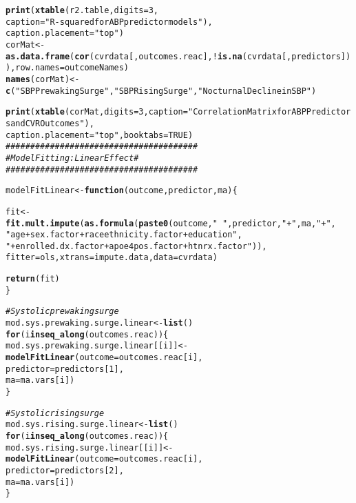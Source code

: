 \documentclass[10pt]{article}\usepackage[]{graphicx}\usepackage[]{color}
\makeatletter
\newcommand{\hlnum}[1]{\textcolor[rgb]{0.686,0.059,0.569}{#1}}%
\newcommand{\hlstr}[1]{\textcolor[rgb]{0.192,0.494,0.8}{#1}}%
\newcommand{\hlcom}[1]{\textcolor[rgb]{0.678,0.584,0.686}{\textit{#1}}}%
\newcommand{\hlopt}[1]{\textcolor[rgb]{0,0,0}{#1}}%
\newcommand{\hlstd}[1]{\textcolor[rgb]{0.345,0.345,0.345}{#1}}%
\newcommand{\hlkwa}[1]{\textcolor[rgb]{0.161,0.373,0.58}{\textbf{#1}}}%
\newcommand{\hlkwb}[1]{\textcolor[rgb]{0.69,0.353,0.396}{#1}}%
\newcommand{\hlkwc}[1]{\textcolor[rgb]{0.333,0.667,0.333}{#1}}%
\newcommand{\hlkwd}[1]{\textcolor[rgb]{0.737,0.353,0.396}{\textbf{#1}}}%
\newenvironment{kframe}{%
 \def\at@end@of@kframe{}%
 \ifinner\ifhmode%
  \def\at@end@of@kframe{\end{minipage}}%
  \begin{minipage}{\columnwidth}%
 \fi\fi%
 \def\FrameCommand##1{\hskip\@totalleftmargin \hskip-\fboxsep
 \colorbox{shadecolor}{##1}\hskip-\fboxsep
     \hskip-\linewidth \hskip-\@totalleftmargin \hskip\columnwidth}%
 \MakeFramed {\advance\hsize-\width
   \@totalleftmargin\z@ \linewidth\hsize
   \@setminipage}}%
 {\par\unskip\endMakeFramed%
 \at@end@of@kframe}
\newenvironment{knitrout}{}{} %
\makeatother
\begin{document}
\begin{knitrout}
\begin{kframe}
\begin{alltt}
\hlkwd{print}\hlstd{(}\hlkwd{xtable}\hlstd{(r2.table,} \hlkwc{digits} \hlstd{=} \hlnum{3}\hlstd{,}
             \hlkwc{caption} \hlstd{=} \hlstr{"R-squared for ABP predictor models"}\hlstd{),}
      \hlkwc{caption.placement} \hlstd{=} \hlstr{"top"}\hlstd{)}
\hlstd{corMat} \hlkwb{<-} \hlkwd{as.data.frame}\hlstd{(}\hlkwd{cor}\hlstd{(cvrdata[,outcomes.reac],} \hlopt{!}\hlkwd{is.na}\hlstd{(cvrdata[,predictors])),} \hlkwc{row.names} \hlstd{= outcomeNames)}
\hlkwd{names}\hlstd{(corMat)} \hlkwb{<-} \hlkwd{c}\hlstd{(}\hlstr{"SBP Prewaking Surge"}\hlstd{,} \hlstr{"SBP Rising Surge"}\hlstd{,} \hlstr{"Nocturnal Decline in SBP"}\hlstd{)}

\hlkwd{print}\hlstd{(}\hlkwd{xtable}\hlstd{(corMat,} \hlkwc{digits} \hlstd{=} \hlnum{3}\hlstd{,} \hlkwc{caption} \hlstd{=} \hlstr{"Correlation Matrix for ABP Predictors and CVR Outcomes"}\hlstd{),}
      \hlkwc{caption.placement} \hlstd{=} \hlstr{"top"}\hlstd{,} \hlkwc{booktabs} \hlstd{=} \hlnum{TRUE}\hlstd{)}
\hlcom{#######################################}
\hlcom{#  Model Fitting: Linear Effect       #}
\hlcom{#######################################}

\hlstd{modelFitLinear} \hlkwb{<-} \hlkwa{function}\hlstd{(}\hlkwc{outcome}\hlstd{,} \hlkwc{predictor}\hlstd{,} \hlkwc{ma}\hlstd{)\{}

  \hlstd{fit} \hlkwb{<-} \hlkwd{fit.mult.impute}\hlstd{(}\hlkwd{as.formula}\hlstd{(}\hlkwd{paste0}\hlstd{(outcome,} \hlstr{"~"}\hlstd{, predictor,} \hlstr{"+"}\hlstd{, ma,} \hlstr{"+"}\hlstd{,}
\hlstr{"age + sex.factor + raceethnicity.factor + education"}\hlstd{,}
\hlstr{"+ enrolled.dx.factor + apoe4pos.factor + htnrx.factor"}\hlstd{)),}
                         \hlkwc{fitter} \hlstd{= ols,} \hlkwc{xtrans} \hlstd{= impute.data,} \hlkwc{data} \hlstd{= cvrdata)}

  \hlkwd{return}\hlstd{(fit)}
\hlstd{\}}


\hlcom{#Systolic prewaking surge}
\hlstd{mod.sys.prewaking.surge.linear} \hlkwb{<-} \hlkwd{list}\hlstd{()}
\hlkwa{for}\hlstd{(i} \hlkwa{in} \hlkwd{seq_along}\hlstd{(outcomes.reac))\{}
  \hlstd{mod.sys.prewaking.surge.linear[[i]]} \hlkwb{<-} \hlkwd{modelFitLinear}\hlstd{(}\hlkwc{outcome} \hlstd{= outcomes.reac[i],}
                                                   \hlkwc{predictor} \hlstd{= predictors[}\hlnum{1}\hlstd{],}
                                                   \hlkwc{ma} \hlstd{= ma.vars[i])}
\hlstd{\}}

\hlcom{#Systolic rising surge}
\hlstd{mod.sys.rising.surge.linear} \hlkwb{<-} \hlkwd{list}\hlstd{()}
\hlkwa{for}\hlstd{(i} \hlkwa{in} \hlkwd{seq_along}\hlstd{(outcomes.reac))\{}
  \hlstd{mod.sys.rising.surge.linear[[i]]} \hlkwb{<-} \hlkwd{modelFitLinear}\hlstd{(}\hlkwc{outcome} \hlstd{= outcomes.reac[i],}
                                           \hlkwc{predictor} \hlstd{= predictors[}\hlnum{2}\hlstd{],}
                                           \hlkwc{ma} \hlstd{= ma.vars[i])}
\hlstd{\}}


\end{alltt}
\end{kframe}
\end{knitrout}
\end{document}

